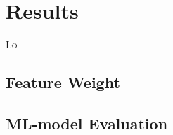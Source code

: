 \chapter{Results}
\label{chap:results}

\lettrine[lines=3, findent=3pt, nindent=0pt]{L}{o} \textcolor{dimgray}{\lipsum[1]}

\section{Feature Weight}
\label{sec:feature-weight}

\textcolor{dimgray}{\lipsum[1-25]}

\section{ML-model Evaluation}
\label{sec:ml-model-evaluation}

\textcolor{dimgray}{\lipsum[1-2]}